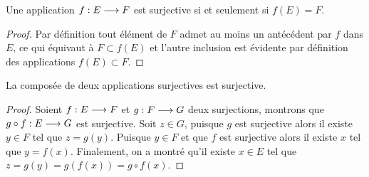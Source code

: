 \begin{prop}
  Une application \(f:E \longrightarrow{} F\) est surjective si et seulement si
  \(f(E) = F\).
\end{prop}
\begin{proof}
  Par définition tout élément de \(F\) admet au moins un antécédent par \(f\)
  dans \(E\), ce qui équivaut à \(F \subset{}f(E)\) et l'autre inclusion est
  évidente par définition des applications \(f(E) \subset{}F\).
\end{proof}

\begin{theo}
  La composée de deux applications surjectives est surjective.
\end{theo}

\begin{proof}
  Soient \(f:E \longrightarrow{} F\) et \(g:F \longrightarrow{} G\) deux surjections,
  montrons que \(g \circ f:E \longrightarrow{} G\) est surjective.
  Soit \(z \in{}G\), puisque \(g\) est surjective alors il existe \(y \in{}F\)
  tel que \(z = g(y)\). Puisque \(y \in{}F\) et que \(f\) est surjective alors il
  existe \(x\) tel que \(y = f(x)\). Finalement, on a montré qu'il existe \(x
  \in{}E\) tel que \(z = g(y) = g(f(x))= g \circ f(x)\).
\end{proof}

